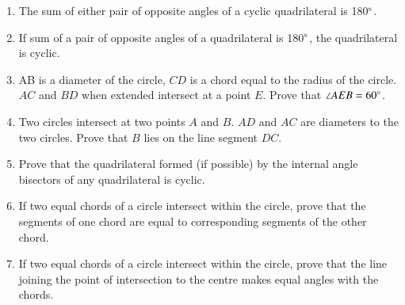 \begin{enumerate}[label=\arabic*.,ref=\thesubsection.\theenumi]
\item  The sum of either pair of opposite angles of a cyclic quadrilateral is 180$\degree$.
\item  If sum of a pair of opposite angles of a quadrilateral is 180$\degree$, the quadrilateral is cyclic.
%
\item AB is a diameter of the circle, $CD$ is a chord equal to the radius of the circle. $AC$ and $BD$ when extended intersect at a point $E$. Prove that $\angle AEB = 60\degree$.
\item Two circles intersect at two points $A$ and $B$. $AD$ and $AC$ are diameters to the two circles. Prove that $B$ lies on the line segment $DC$.
\item Prove that the quadrilateral formed (if possible) by the internal angle bisectors of any quadrilateral is cyclic.
\item  If two equal chords of a circle intersect within the circle, prove that the segments of one chord are equal to corresponding segments of the other chord.
\item If two equal chords of a circle intersect within the circle, prove that the line joining the point of intersection to the centre makes equal angles with the chords.
\begin{enumerate}


\end{enumerate}


\end{enumerate}
